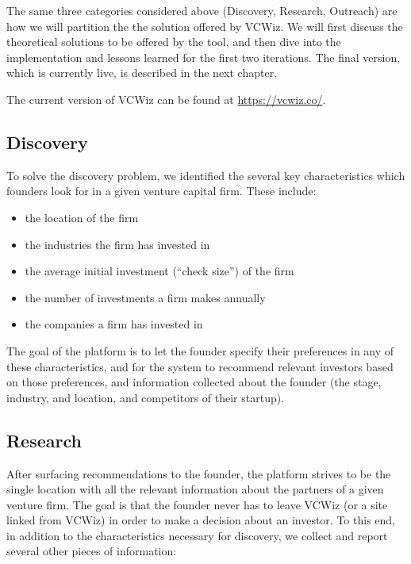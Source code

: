The same three categories considered above (Discovery, Research, Outreach) are how we will partition the the solution offered by VCWiz. We will first discuss the theoretical solutions to be offered by the tool, and then dive into the implementation and lessons learned for the first two iterations. The final version, which is currently live, is described in the next chapter.

The current version of VCWiz can be found at \url{https://vcwiz.co/}.

\subsection{Discovery}

To solve the discovery problem, we identified the several key characteristics which founders look for in a given venture capital firm. These include:

\begin{itemize}
  \item the location of the firm
  \item the industries the firm has invested in
  \item the average initial investment (``check size'') of the firm
  \item the number of investments a firm makes annually
  \item the companies a firm has invested in
\end{itemize}

The goal of the platform is to let the founder specify their preferences in any of these characteristics, and for the system to recommend relevant investors based on those preferences, and information collected about the founder (the stage, industry, and location, and competitors of their startup).

\subsection{Research}

After surfacing recommendations to the founder, the platform strives to be the single location with all the relevant information about the partners of a given venture firm. The goal is that the founder never has to leave VCWiz (or a site linked from VCWiz) in order to make a decision about an investor. To this end, in addition to the characteristics necessary for discovery, we collect and report several other pieces of information:

